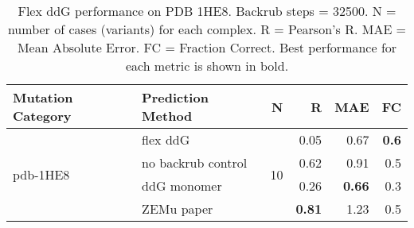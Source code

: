 \begin{table}
  \begin{tabular}{llrrrr}
\toprule
Mutation Category &   Prediction Method &   N &    R &  MAE &  FC \\
\midrule
 \multirow{ 4}{*}{pdb-1HE8} & flex ddG & \multirow{ 4}{*}{10} & 0.05 & 0.67 & \textbf{0.6}  \\
 & no backrub control & & 0.62 & 0.91 & 0.5  \\
 & ddG monomer & & 0.26 & \textbf{0.66} & 0.3  \\
 & ZEMu paper & & \textbf{0.81} & 1.23 & 0.5  \\
\bottomrule
\end{tabular}
  \caption[Flex ddG performance on PDB 1HE8]{
    Flex ddG performance on PDB 1HE8. Backrub steps = 32500. N = number of cases (variants) for each complex. R = Pearson's R. MAE = Mean Absolute Error. FC = Fraction Correct. Best performance for each metric is shown in bold.
  } \label{tab:table-pdb-1HE8}
\end{table}
